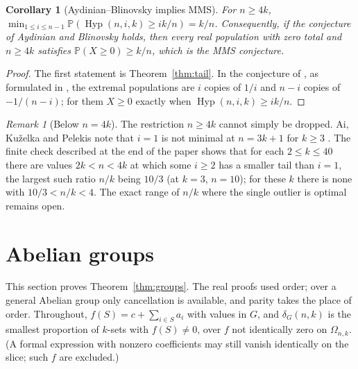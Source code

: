 \documentclass[11pt]{article}
\newtheorem{corollary}[theorem]{Corollary}
\theoremstyle{remark}
\newtheorem{remark}[theorem]{Remark}
\newcommand{\Prb}{\mathbb P}
\newcommand{\Hyp}{\operatorname{Hyp}}
\begin{document}
\begin{corollary}[Aydinian--Blinovsky implies MMS]\label{cor:AB}
For \(n\ge4k\), \(\min_{1\le i\le n-1}\Prb(\Hyp(n,i,k)\ge ik/n)=k/n\).
Consequently, if the conjecture of Aydinian and Blinovsky \cite{AB} holds,
then every real population with zero total and \(n\ge4k\) satisfies
\(\Prb(X\ge0)\ge k/n\), which is the MMS conjecture.
\end{corollary}
\begin{proof}
The first statement is Theorem~\ref{thm:tail}. In the conjecture of \cite{AB},
as formulated in \cite{AKP,AP}, the extremal populations are \(i\) copies of
\(1/i\) and \(n-i\) copies of \(-1/(n-i)\); for them \(X\ge0\) exactly when
\(\Hyp(n,i,k)\ge ik/n\).
\end{proof}

\begin{remark}[Below \(n=4k\)]\label{rem:below4k}
The restriction \(n\ge4k\) cannot simply be dropped. Ai, Ku\v{z}elka and
Pelekis note that \(i=1\) is not minimal at \(n=3k+1\) for \(k\ge3\) \cite{AKP}. The finite
check described at the end of the paper shows that for each \(2\le k\le40\) there are
values \(2k<n<4k\) at which some \(i\ge2\) has a smaller tail than \(i=1\), the
largest such ratio \(n/k\) being \(10/3\) (at \(k=3\), \(n=10\)); for these \(k\)
there is none with \(10/3<n/k<4\). The exact range of \(n/k\) where the single outlier is optimal
remains open.
\end{remark}

\section{Abelian groups}\label{sec:abelian}

This section proves Theorem~\ref{thm:groups}. The real proofs used order; over
a general Abelian group only cancellation is available, and parity takes the
place of order. Throughout, \(f(S)=c+\sum_{i\in S}a_i\) with values in \(G\),
and \(\delta_G(n,k)\) is the smallest proportion of \(k\)-sets with
\(f(S)\ne0\), over \(f\) not identically zero on \(\Omega_{n,k}\). (A formal
expression with nonzero coefficients may still vanish identically on the
slice; such \(f\) are excluded.)
\end{document}
